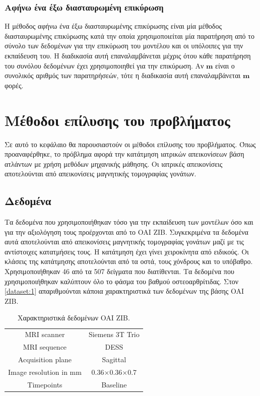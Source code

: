 \documentclass[a4paper,12pt]{article}
\begin{document}
\subsubsection{Αφήνω ένα έξω διασταυρωμένη επικύρωση} \label{leave_one_out:1}

Η μέθοδος αφήνω ένα έξω διασταυρωμένης επικύρωσης είναι μία μέθοδος
διασταυρωμένης επικύρωσης κατά την οποία χρησιμοποιείται μία παρατήρηση από το
σύνολο των δεδομένων για την επικύρωση του μοντέλου και οι υπόλοιπες για την
εκπαίδευση του. Η διαδικασία αυτή επαναλαμβάνεται μέχρις ότου κάθε παρατήρηση
του συνόλου δεδομένων έχει χρησιμοποιηθεί για την επικύρωση. Αν $\bm{m}$ είναι ο
συνολικός αριθμός των παρατηρήσεών, τότε η διαδικασία αυτή επαναλαμβάνεται
$\bm{m}$ φορές.

\section{Μέθοδοι επίλυσης του προβλήματος}

Σε αυτό το κεφάλαιο θα παρουσιαστούν οι μέθοδοι επίλυσης του προβλήματος. Όπως
προαναφέρθηκε, το πρόβλημα αφορά την κατάτμηση ιατρικών απεικονίσεων βάση
ατλάντων με χρήση μεθόδων μηχανικής μάθησης. Οι ιατρικές απεικονίσεις
αποτελούνται από απεικονίσεις μαγνητικής τομογραφίας γονάτων.

\subsection{Δεδομένα} \label{data:1}

Τα δεδομένα που χρησιμοποιήθηκαν τόσο για την εκπαίδευση των μοντέλων όσο και
για την αξιολόγηση τους προέρχονται από το OAI ZIB. Συγκεκριμένα τα δεδομένα
αυτά αποτελούνται από απεικονίσεις μαγνητικής τομογραφίας γονάτων μαζί με τις
αντίστοιχες κατατμήσεις τους. Η κατάτμηση έχει γίνει χειροκίνητα από ειδικούς.
Οι κλάσεις της κατάτμησης αποτελούνται από τα οστά, τους χόνδρους και το
υπόβαθρο.  Χρησιμοποιήθηκαν 46 από τα 507 δείγματα που διατίθενται. Τα δεδομένα
που χρησιμοποιήθηκαν καλύπτουν όλο το φάσμα του βαθμού οστεοαρθρίτιδας. Στον
\autoref{dataset:1} απαριθμούνται κάποια χαρακτηριστικά των δεδομένων της βάσης
OAI ZIB.

\begin{table}[h!]
    \centering
    \begin{tabular}{|c|c|} 
        \hline
        MRI scanner            & Siemens 3T Trio \\ 
        MRI sequence           & DESS            \\
        Acquisition plane      & Sagittal        \\
        Image resolution in mm & 0.36×0.36×0.7   \\
        Timepoints             & Baseline        \\
        \hline
    \end{tabular}
    \caption{Χαρακτηριστικά δεδομένων OAI ZIB.}
    \label{dataset:1}
\end{table}
\end{document}
